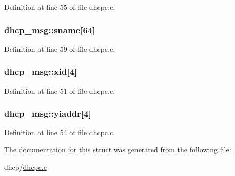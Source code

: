 Definition at line 55 of file dhcpc.c.

\hypertarget{structdhcp__msg_ad203bdcc6153f9f53fa22ed7806c4fd9}{
\subsubsection[{sname}]{ {\bf dhcp\_\-msg::sname}\mbox{[}64\mbox{]}}}
\label{structdhcp__msg_ad203bdcc6153f9f53fa22ed7806c4fd9}


Definition at line 59 of file dhcpc.c.

\hypertarget{structdhcp__msg_a8b0ff8bae8d7e2045af329d8af0eae85}{
\subsubsection[{xid}]{ {\bf dhcp\_\-msg::xid}\mbox{[}4\mbox{]}}}
\label{structdhcp__msg_a8b0ff8bae8d7e2045af329d8af0eae85}


Definition at line 51 of file dhcpc.c.

\hypertarget{structdhcp__msg_a292fb4679f1fe8dbf29ca0a17991a6e7}{
\subsubsection[{yiaddr}]{ {\bf dhcp\_\-msg::yiaddr}\mbox{[}4\mbox{]}}}
\label{structdhcp__msg_a292fb4679f1fe8dbf29ca0a17991a6e7}


Definition at line 54 of file dhcpc.c.



The documentation for this struct was generated from the following file:\begin{DoxyCompactItemize}
\item 
dhcp/\hyperlink{dhcpc_8c}{dhcpc.c}\end{DoxyCompactItemize}
